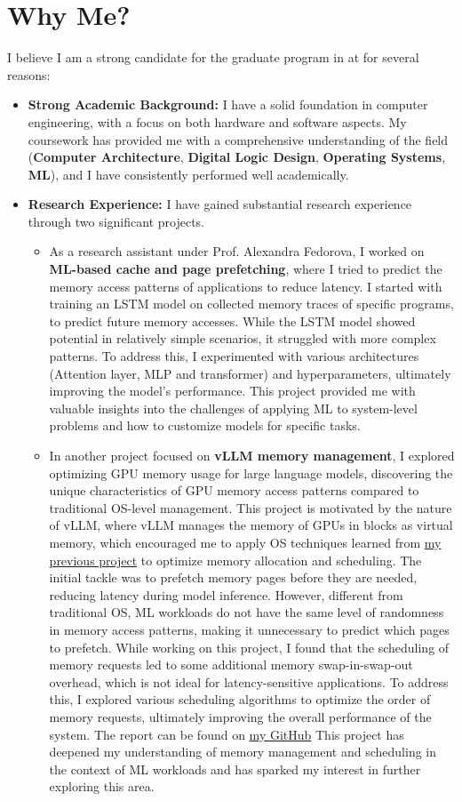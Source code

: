 \documentclass[a4 paper, 10pt]{article}
\begin{document}
\section*{Why Me?}
I believe I am a strong candidate for the graduate program in \theDepartment{} at \theSchoolFullName{} for several reasons:
\begin{itemize}
    \item \textbf{Strong Academic Background:} I have a solid foundation in {computer engineering}, with a focus on both {hardware and software} aspects. My coursework has provided me with a comprehensive understanding of the field (\textbf{Computer Architecture}, \textbf{Digital Logic Design}, \textbf{Operating Systems}, \textbf{ML}), and I have consistently performed well academically.
    \item \textbf{Research Experience:} I have gained substantial research experience through two significant projects. \begin{itemize}
		\label{prefetching}
		\item As a research assistant under Prof. Alexandra Fedorova, I worked on \textbf{ML-based cache and page prefetching}, where I tried to predict the memory access patterns of applications to reduce latency. I started with training an LSTM model on collected memory traces of specific programs, to predict future memory accesses. While the LSTM model showed potential in relatively simple scenarios, it struggled with more complex patterns. To address this, I experimented with various architectures (Attention layer, MLP and transformer) and hyperparameters, ultimately improving the model's performance. This project provided me with valuable insights into the challenges of applying ML to system-level problems and how to customize models for specific tasks.
		\label{vllm}
		\item In another project focused on \textbf{vLLM memory management}, I explored optimizing GPU memory usage for large language models, discovering the unique characteristics of GPU memory access patterns compared to traditional OS-level management. This project is motivated by the nature of vLLM, where vLLM manages the memory of GPUs in blocks as virtual memory, which encouraged me to apply OS techniques learned from \hyperref[prefetching]{my previous project} to optimize memory allocation and scheduling. The initial tackle was to prefetch memory pages before they are needed, reducing latency during model inference. However, different from traditional OS, ML workloads do not have the same level of randomness in memory access patterns, making it unnecessary to predict which pages to prefetch. While working on this project, I found that the scheduling of memory requests led to some additional memory swap-in-swap-out overhead, which is not ideal for latency-sensitive applications. To address this, I explored various scheduling algorithms to optimize the order of memory requests, ultimately improving the overall performance of the system. The report can be found on \hyperlink{https://luckunately.github.io/courses/CPEN511/Final_report.pdf}{my GitHub} This project has deepened my understanding of memory management and scheduling in the context of ML workloads and has sparked my interest in further exploring this area.

\end{itemize}
\end{itemize}
\end{document}

